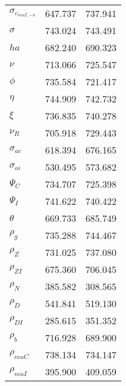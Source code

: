 \begin{center}
\begin{longtable}{lcc}
$ \sigma_{{e_{muI,-4}}}   $	 & 	     647.737	 & 	     737.941 \\ 
$ {\sigma}                $	 & 	     743.024	 & 	     743.491 \\ 
$ {ha}                    $	 & 	     682.240	 & 	     690.323 \\ 
$ \nu                     $	 & 	     713.066	 & 	     725.547 \\ 
$ {\phi}                  $	 & 	     735.584	 & 	     721.417 \\ 
$ {\eta}                  $	 & 	     744.909	 & 	     742.732 \\ 
$ \xi                     $	 & 	     736.835	 & 	     740.278 \\ 
$ {\nu_R}                 $	 & 	     705.918	 & 	     729.443 \\ 
$ {\sigma_{ac}}           $	 & 	     618.394	 & 	     676.165 \\ 
$ {\sigma_{ai}}           $	 & 	     530.495	 & 	     573.682 \\ 
$ {\Psi_{C}}              $	 & 	     734.707	 & 	     725.398 \\ 
$ {\Psi_I}                $	 & 	     741.622	 & 	     740.422 \\ 
$ {\theta}                $	 & 	     669.733	 & 	     685.749 \\ 
$ {\rho_g}                $	 & 	     735.288	 & 	     744.467 \\ 
$ {\rho_Z}                $	 & 	     731.025	 & 	     737.080 \\ 
$ {\rho_{ZI}}             $	 & 	     675.360	 & 	     706.045 \\ 
$ {\rho_N}                $	 & 	     385.582	 & 	     308.565 \\ 
$ {\rho_D}                $	 & 	     541.841	 & 	     519.130 \\ 
$ {\rho_{DI}}             $	 & 	     285.615	 & 	     351.352 \\ 
$ {\rho_b}                $	 & 	     716.928	 & 	     689.900 \\ 
$ {\rho_{muC}}            $	 & 	     738.134	 & 	     734.147 \\ 
$ {\rho_{muI}}            $	 & 	     395.900	 & 	     409.059 \\ 
\end{longtable}
 \end{center}
